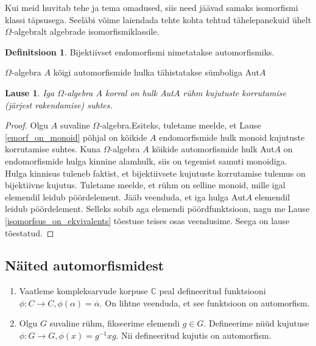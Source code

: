 \documentclass[12pt]{report}
\numberwithin{equation}{section}
\theoremstyle{definition}
\newtheorem{automorfism}[equation]{Definitsioon}
\theoremstyle{plain}
\newtheorem{automorfismide_hulk_on_ruhm}[equation]{Lause}
\begin{document}
Kui meid huvitab tehe ja tema omadused, siis need jäävad samaks isomorfismi klassi täpsusega. Seeläbi võime laiendada tehte kohta tehtud tähelepanekuid \"uhelt $\Omega$-algebralt  algebrade isomorfismiklassile.


\begin{automorfism}
Bijektiivset endomorfismi nimetatakse automorfismiks.
\end{automorfism}

$\Omega$-algebra $A$ kõigi automorfismide hulka tähistatakse s\"umboliga Aut$A$ 

\begin{automorfismide_hulk_on_ruhm}
Iga $\Omega$-algebra $A$ korral on hulk Aut$A$ rühm kujutuste korrutamise (järjest rakendamise) suhtes. 
\end{automorfismide_hulk_on_ruhm}

\begin{proof}
Olgu $A$ suvaline $\Omega$-algebra.Esiteks, tuletame meelde, et Lause \ref{emorf_on_monoid} põhjal on kõikide $A$ endomorfismide hulk monoid kujutuste korrutamise suhtes. Kuna $\Omega$-algebra $A$ kõikide automorfismide hulk Aut$A$ on endomorfismide hulga kinnine alamhulk, siis on tegemist samuti monoidiga. Hulga kinnisus tuleneb faktist, et bijektiivsete kujutuste korrutamise tulemus on bijektiivne kujutus. Tuletame meelde, et r\"uhm on selline monoid, mille igal elemendil leidub pöördelement. Jääb veenduda, et iga hulga Aut$A$ elemendil leidub pöördelement. Selleks sobib aga elemendi pöördfunktsioon, nagu me Lause \ref{isomorfsus_on_ekvivalents} tõestuse teises osas veendusime. Seega on lause tõestatud.
\end{proof}


 
\subsection*{Näited automorfismidest}
 \begin{enumerate}[I]
 \item{Vaatleme kompleksarvude korpuse $\mathbb{C}$ peal defineeritud funktsiooni
 $\phi: C \rightarrow C, \phi(\alpha) = \overline{\alpha}$. On lihtne veenduda, et see funktsioon on automorfism.} 
 
 \item{Olgu $G$ suvaline r\"uhm, fikseerime elemendi $g \in G$. Defineerime n\"u\"ud kujutuse $\phi : G \to G, \phi(x) = g^{-1} x g $. Nii defineeritud kujutis on automorfism.} 
 
 \end{enumerate}
 
\end{document}
